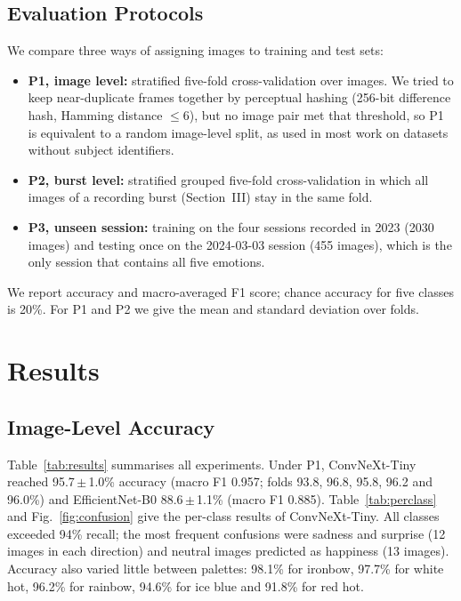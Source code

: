 \documentclass[10pt,twocolumn,letterpaper]{article}
\begin{document}
\subsection{Evaluation Protocols}
We compare three ways of assigning images to training and test sets:
\begin{itemize}
\item \textbf{P1, image level:} stratified five-fold cross-validation over images. We tried to keep near-duplicate frames together by perceptual hashing (256-bit difference hash, Hamming distance $\le 6$), but no image pair met that threshold, so P1 is equivalent to a random image-level split, as used in most work on datasets without subject identifiers.
\item \textbf{P2, burst level:} stratified grouped five-fold cross-validation in which all images of a recording burst (Section~III) stay in the same fold.
\item \textbf{P3, unseen session:} training on the four sessions recorded in 2023 (2030 images) and testing once on the 2024-03-03 session (455 images), which is the only session that contains all five emotions.
\end{itemize}
We report accuracy and macro-averaged F1 score; chance accuracy for five classes is 20\%. For P1 and P2 we give the mean and standard deviation over folds.

\section{Results}

\subsection{Image-Level Accuracy}
Table~\ref{tab:results} summarises all experiments. Under P1, ConvNeXt-Tiny reached 95.7\,$\pm$\,1.0\% accuracy (macro F1 0.957; folds 93.8, 96.8, 95.8, 96.2 and 96.0\%) and EfficientNet-B0 88.6\,$\pm$\,1.1\% (macro F1 0.885). Table~\ref{tab:perclass} and Fig.~\ref{fig:confusion} give the per-class results of ConvNeXt-Tiny. All classes exceeded 94\% recall; the most frequent confusions were sadness and surprise (12 images in each direction) and neutral images predicted as happiness (13 images). Accuracy also varied little between palettes: 98.1\% for ironbow, 97.7\% for white hot, 96.2\% for rainbow, 94.6\% for ice blue and 91.8\% for red hot.
\end{document}
